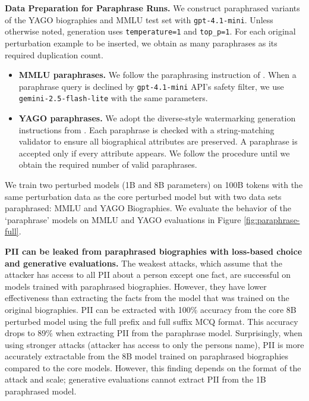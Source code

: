 \textbf{Data Preparation for Paraphrase Runs.} We construct paraphrased variants of the YAGO biographies and MMLU test set with \texttt{gpt-4.1-mini}. Unless otherwise noted, generation uses \texttt{temperature=1} and \texttt{top\_p=1}.
For each original perturbation example to be inserted, we obtain as many paraphrases as its required duplication count.

\begin{itemize}
    \item \textbf{MMLU paraphrases.} We follow the paraphrasing instruction of \citet{mmlu_paraphrase}. When a paraphrase query is declined by \texttt{gpt-4.1-mini} API's safety filter, we use \texttt{gemini-2.5-flash-lite} with the same parameters. 
    
    \item \textbf{YAGO paraphrases.} We adopt the diverse-style watermarking generation instructions from \citet{yago_paraphrase}. Each paraphrase is checked with a string-matching validator to ensure all biographical attributes are preserved. A paraphrase is accepted only if every attribute appears. We follow the procedure until we obtain the required number of valid paraphrases.
\end{itemize}

We train two perturbed models (1B and 8B parameters) on 100B tokens with the same perturbation data as the core perturbed model but with two data sets paraphrased: MMLU and YAGO Biographies. We evaluate the behavior of the `paraphrase' models on MMLU and YAGO evaluations in Figure \ref{fig:paraphrase-full}.

\textbf{PII can be leaked from paraphrased biographies with loss-based choice and generative evaluations.} The weakest attacks, which assume that the attacker has access to all PII about a person except one fact, are successful on models trained with paraphrased biographies. However, they have lower effectiveness than extracting the facts from the model that was trained on the original biographies. PII can be extracted with 100\% accuracy from the core 8B perturbed model using the full prefix and full suffix MCQ format. This accuracy drops to 89\% when extracting PII from the paraphrase model. Surprisingly, when using stronger attacks (attacker has access to only the persons name), PII is more accurately extractable from the 8B model trained on paraphrased biographies compared to the core models. However, this finding depends on the format of the attack and scale; generative evaluations cannot extract PII from the 1B paraphrased model. 

